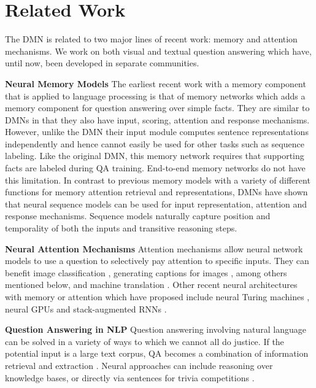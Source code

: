 \documentclass{article}
\begin{document}
\section{Related Work}
The DMN is related to two major lines of recent work: memory and attention mechanisms.
We work on both visual and textual question answering which have, until now, been developed in separate communities.

\textbf{Neural Memory Models}
The earliest recent work with a memory component that is applied to language processing is that of memory networks \cite{Weston2015} which adds a memory component for question answering over simple facts.
They are similar to DMNs in that they also have input, scoring, attention and response mechanisms.
However, unlike the DMN their input module computes sentence representations independently and hence cannot easily be used for other tasks such as sequence labeling.
Like the original DMN, this memory network requires that supporting facts are labeled during QA training.
End-to-end memory networks \cite{Sukhbaatar2015} do not have this limitation.
In contrast to previous memory models with a variety of different functions for memory attention retrieval and representations, DMNs \cite{Kumar2015} have shown that neural sequence models can be used for input representation, attention and response mechanisms. 
Sequence models naturally capture position and temporality of both the inputs and transitive reasoning steps.

\textbf{Neural Attention Mechanisms} Attention mechanisms allow neural network models to use a question to selectively pay attention to specific inputs.
They can benefit image classification \cite{Stollenga2014}, generating captions for images \cite{Xu2015}, among others mentioned below, and machine translation \cite{Cho2014b,Bahdanau2015,Luong2015}.
Other recent neural architectures with memory or attention which have
proposed include neural Turing machines \cite{Graves2014}, neural GPUs \cite{Kaiser2015} and stack-augmented RNNs \cite{Joulin2015}.

\textbf{Question Answering in NLP} 
Question answering involving natural language can be solved in a variety of ways to which we cannot all do justice. If the potential input is a large text corpus, QA becomes a combination of information retrieval and extraction \cite{Yates2007}.
Neural approaches can include reasoning over knowledge bases, \cite{Bordes2012,Socher2013:NTN} or directly via sentences for trivia competitions \cite{Iyyer2014}. 
\end{document}
